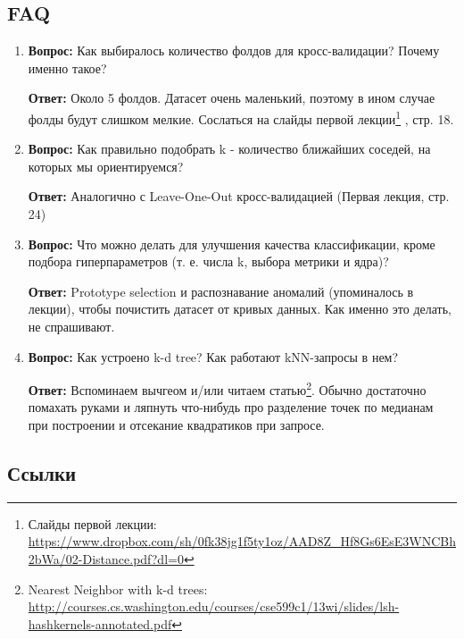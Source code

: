 \documentclass[11pt]{article}
\begin{document}
\subsection{FAQ}
\label{sec:orgheadline4}
\begin{enumerate}
\item \textbf{Вопрос:}
   Как выбиралось количество фолдов для кросс-валидации? Почему именно такое?

\textbf{Ответ:}
Около 5 фолдов. Датасет очень маленький, поэтому в ином случае фолды будут
слишком мелкие. Сослаться на слайды первой лекции\footnote{Слайды первой лекции: \url{https://www.dropbox.com/sh/0fk38jg1f5ty1oz/AAD8Z_Hf8Gs6EsE3WNCBh2bWa/02-Distance.pdf?dl=0}} , стр. 18.

\item \textbf{Вопрос:}
Как правильно подобрать k - количество ближайших соседей, на которых мы
ориентируемся?

\textbf{Ответ:}
Аналогично с Leave-One-Out кросс-валидацией (Первая лекция\footnotemark[1]{}, стр. 24)

\item \textbf{Вопрос:}
Что можно делать для улучшения качества классификации, кроме подбора
гиперпараметров (т. е. числа k, выбора метрики и ядра)?

\textbf{Ответ:}
Prototype selection и распознавание аномалий (упоминалось в лекции\footnotemark[1]{}),
чтобы почистить датасет от кривых данных. Как именно это делать, не
спрашивают.

\item \textbf{Вопрос:}
   Как устроено k-d tree? Как работают kNN-запросы в нем?

\textbf{Ответ:}
Вспоминаем вычгеом и/или читаем статью\footnote{Nearest Neighbor with k-d trees: \url{http://courses.cs.washington.edu/courses/cse599c1/13wi/slides/lsh-hashkernels-annotated.pdf}}.
Обычно достаточно помахать руками и ляпнуть что-нибудь про разделение
точек по медианам при построении и отсекание квадратиков при запросе.
\end{enumerate}
\subsection{Ссылки}
\label{sec:orgheadline5}
\end{document}
